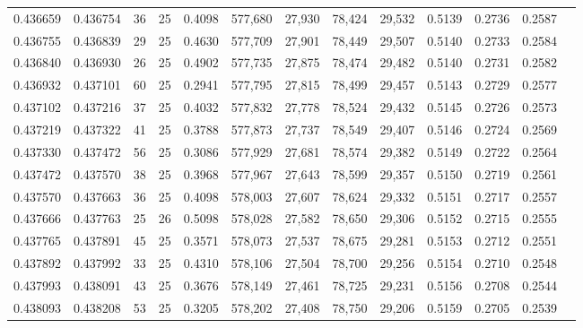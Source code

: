 \begin{tabular}{rrrrrrrrrrrrr}
0.436659 & 0.436754 &    36 &  25 &                                     0.4098 & 577,680 &  27,930 &  78,424 &  29,532 & 0.5139 & 0.2736 & 0.2587 \\
0.436755 & 0.436839 &    29 &  25 &                                     0.4630 & 577,709 &  27,901 &  78,449 &  29,507 & 0.5140 & 0.2733 & 0.2584 \\
0.436840 & 0.436930 &    26 &  25 &                                     0.4902 & 577,735 &  27,875 &  78,474 &  29,482 & 0.5140 & 0.2731 & 0.2582 \\
0.436932 & 0.437101 &    60 &  25 &                                     0.2941 & 577,795 &  27,815 &  78,499 &  29,457 & 0.5143 & 0.2729 & 0.2577 \\
0.437102 & 0.437216 &    37 &  25 &                                     0.4032 & 577,832 &  27,778 &  78,524 &  29,432 & 0.5145 & 0.2726 & 0.2573 \\
0.437219 & 0.437322 &    41 &  25 &                                     0.3788 & 577,873 &  27,737 &  78,549 &  29,407 & 0.5146 & 0.2724 & 0.2569 \\
0.437330 & 0.437472 &    56 &  25 &                                     0.3086 & 577,929 &  27,681 &  78,574 &  29,382 & 0.5149 & 0.2722 & 0.2564 \\
0.437472 & 0.437570 &    38 &  25 &                                     0.3968 & 577,967 &  27,643 &  78,599 &  29,357 & 0.5150 & 0.2719 & 0.2561 \\
0.437570 & 0.437663 &    36 &  25 &                                     0.4098 & 578,003 &  27,607 &  78,624 &  29,332 & 0.5151 & 0.2717 & 0.2557 \\
0.437666 & 0.437763 &    25 &  26 &                                     0.5098 & 578,028 &  27,582 &  78,650 &  29,306 & 0.5152 & 0.2715 & 0.2555 \\
0.437765 & 0.437891 &    45 &  25 &                                     0.3571 & 578,073 &  27,537 &  78,675 &  29,281 & 0.5153 & 0.2712 & 0.2551 \\
0.437892 & 0.437992 &    33 &  25 &                                     0.4310 & 578,106 &  27,504 &  78,700 &  29,256 & 0.5154 & 0.2710 & 0.2548 \\
0.437993 & 0.438091 &    43 &  25 &                                     0.3676 & 578,149 &  27,461 &  78,725 &  29,231 & 0.5156 & 0.2708 & 0.2544 \\
0.438093 & 0.438208 &    53 &  25 &                                     0.3205 & 578,202 &  27,408 &  78,750 &  29,206 & 0.5159 & 0.2705 & 0.2539 \\

\end{tabular}
